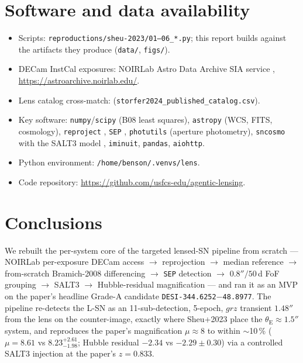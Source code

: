\documentclass[11pt,letterpaper]{article}
\newcommand{\thetaE}{\ensuremath{\theta_{\mathrm{E}}}}
\newcommand{\muamp}{\ensuremath{\mu}}
\newcommand{\target}{\texttt{DESI-344.6252$-$48.8977}}
\begin{document}
\section{Software and data availability}

\begin{itemize}
\item Scripts: \texttt{reproductions/sheu-2023/01--06\_*.py}; this report
      builds against the artifacts they produce
      (\texttt{data/}, \texttt{figs/}).
\item DECam InstCal exposures: NOIRLab Astro Data Archive SIA service
      \autocite{noirlab2025archive},
      \url{https://astroarchive.noirlab.edu/}.
\item Lens catalog cross-match: \citet{storfer2024catalog}
      (\texttt{storfer2024\_published\_catalog.csv}).
\item Key software: \texttt{numpy}/\texttt{scipy} (B08 least squares),
      \texttt{astropy} \autocite{astropy2022} (WCS, FITS, cosmology),
      \texttt{reproject} \autocite{robitaille2020reproject},
      \texttt{SEP} \autocite{barbary2016sep},
      \texttt{photutils} \autocite{bradley2024photutils} (aperture
      photometry), \texttt{sncosmo} \autocite{barbary2024sncosmo} with the
      SALT3 model \autocite{kenworthy2021salt3},
      \texttt{iminuit}, \texttt{pandas}, \texttt{aiohttp}.
\item Python environment: \texttt{/home/benson/.venvs/lens}.
\item Code repository: \url{https://github.com/usfcs-edu/agentic-lensing}.
\end{itemize}

\section{Conclusions}

We rebuilt the per-system core of the \citet{sheu2023lensedsne} targeted
lensed-SN pipeline from scratch --- NOIRLab per-exposure DECam access $\to$
reprojection $\to$ median reference $\to$ from-scratch Bramich-2008
differencing $\to$ \texttt{SEP} detection $\to$ $0.8''/50$\,d FoF grouping
$\to$ SALT3 $\to$ Hubble-residual magnification --- and ran it as an MVP on
the paper's headline Grade-A candidate \target. The pipeline re-detects the
L-SN as an 11-sub-detection, 5-epoch, $grz$ transient $1.48''$ from the lens
on the counter-image, exactly where Sheu+2023 place the $\thetaE\approx1.5''$
system, and reproduces the paper's magnification $\muamp\approx8$ to within
$\sim$10\,\% ($\muamp=8.61$ vs $8.23^{+2.61}_{-1.98}$; Hubble residual
$-2.34$ vs $-2.29\pm0.30$) via a controlled SALT3 injection at the paper's
$z=0.833$.
\end{document}
